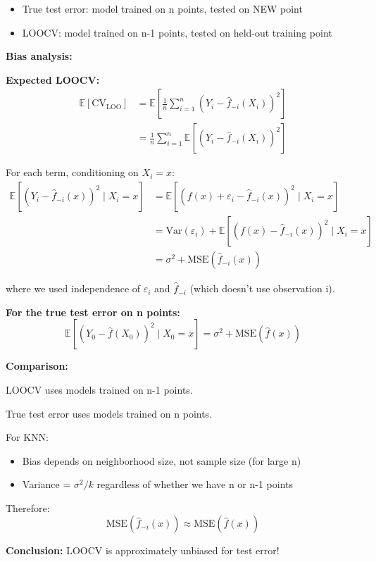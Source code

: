 \documentclass[12pt]{article}
\begin{document}
\begin{explanation}
\begin{itemize}
    \item True test error: model trained on n points, tested on NEW point
    \item LOOCV: model trained on n-1 points, tested on held-out training point
\end{itemize}

\textbf{Bias analysis:}

\textbf{Expected LOOCV:}
\begin{align*}
\mathbb{E}[\text{CV}_{\text{LOO}}] &= \mathbb{E}\left[\frac{1}{n}\sum_{i=1}^n (Y_i - \hat{f}_{-i}(X_i))^2\right] \\
&= \frac{1}{n}\sum_{i=1}^n \mathbb{E}\left[(Y_i - \hat{f}_{-i}(X_i))^2\right]
\end{align*}

For each term, conditioning on $X_i = x$:
\begin{align*}
\mathbb{E}\left[(Y_i - \hat{f}_{-i}(x))^2 \mid X_i = x\right] &= \mathbb{E}\left[(f(x) + \varepsilon_i - \hat{f}_{-i}(x))^2 \mid X_i = x\right] \\
&= \text{Var}(\varepsilon_i) + \mathbb{E}\left[(f(x) - \hat{f}_{-i}(x))^2 \mid X_i = x\right] \\
&= \sigma^2 + \text{MSE}(\hat{f}_{-i}(x))
\end{align*}

where we used independence of $\varepsilon_i$ and $\hat{f}_{-i}$ (which doesn't use observation i).

\textbf{For the true test error on n points:}
\[
\mathbb{E}\left[(Y_0 - \hat{f}(X_0))^2 \mid X_0 = x\right] = \sigma^2 + \text{MSE}(\hat{f}(x))
\]

\textbf{Comparison:}

LOOCV uses models trained on n-1 points.

True test error uses models trained on n points.

For KNN:
\begin{itemize}
    \item Bias depends on neighborhood size, not sample size (for large n)
    \item Variance = $\sigma^2/k$ regardless of whether we have n or n-1 points
\end{itemize}

Therefore:
\[
\text{MSE}(\hat{f}_{-i}(x)) \approx \text{MSE}(\hat{f}(x))
\]

\textbf{Conclusion:} LOOCV is approximately unbiased for test error!


\end{explanation}
\end{document}

